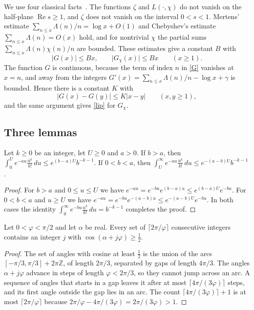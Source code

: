We use four classical facts~\cite{davenport}. The functions $\zeta$ and $L(\cdot,\chi)$ do not vanish on the half-plane $\operatorname{Re}s\ge1$, and $\zeta$ does not vanish on the interval $0<s<1$. Mertens' estimate $\sum_{n\le x}\Lambda(n)/n=\log x+O(1)$ and Chebyshev's estimate $\sum_{n\le x}\Lambda(n)=O(x)$ hold, and for nontrivial $\chi$ the partial sums $\sum_{n\le x}\Lambda(n)\chi(n)/n$ are bounded. These estimates give a constant $B$ with
\begin{equation}\label{triv}
\lvert G(x)\rvert\le Bx,\qquad \lvert G_\chi(x)\rvert\le Bx\qquad(x\ge1).
\end{equation}
The function $G$ is continuous, because the term of index $n$ in \eqref{G} vanishes at $x=n$, and away from the integers $G'(x)=\sum_{n\le x}\Lambda(n)/n-\log x+\gamma$ is bounded. Hence there is a constant $K$ with
\begin{equation}\label{lip}
\lvert G(x)-G(y)\rvert\le K\lvert x-y\rvert\qquad(x,y\ge1),
\end{equation}
and the same argument gives \eqref{lip} for $G_\chi$.

\subsection{Three lemmas}

\begin{lemma}\label{tails}
Let $k\ge0$ be an integer, let $U\ge0$ and $a>0$. If $b>a$, then $\int_0^Ue^{-au}\frac{u^k}{k!}\,du\le e^{(b-a)U}b^{-k-1}$. If $0<b<a$, then $\int_U^\infty e^{-au}\frac{u^k}{k!}\,du\le e^{-(a-b)U}b^{-k-1}$.
\end{lemma}

\begin{proof}
For $b>a$ and $0\le u\le U$ we have $e^{-au}=e^{-bu}e^{(b-a)u}\le e^{(b-a)U}e^{-bu}$. For $0<b<a$ and $u\ge U$ we have $e^{-au}=e^{-bu}e^{-(a-b)u}\le e^{-(a-b)U}e^{-bu}$. In both cases the identity $\int_0^\infty e^{-bu}\frac{u^k}{k!}\,du=b^{-k-1}$ completes the proof.
\end{proof}

\begin{lemma}\label{rot}
Let $0<\varphi<\pi/2$ and let $\alpha$ be real. Every set of $\lceil2\pi/\varphi\rceil$ consecutive integers contains an integer $j$ with $\cos(\alpha+j\varphi)\ge\frac12$.
\end{lemma}

\begin{proof}
The set of angles with cosine at least $\frac12$ is the union of the arcs $[-\pi/3,\pi/3]+2\pi\mathbb Z$, of length $2\pi/3$, separated by gaps of length $4\pi/3$. The angles $\alpha+j\varphi$ advance in steps of length $\varphi<2\pi/3$, so they cannot jump across an arc. A sequence of angles that starts in a gap leaves it after at most $\lceil4\pi/(3\varphi)\rceil$ steps, and its first angle outside the gap lies in an arc. The count $\lceil4\pi/(3\varphi)\rceil+1$ is at most $\lceil2\pi/\varphi\rceil$ because $2\pi/\varphi-4\pi/(3\varphi)=2\pi/(3\varphi)>1$.
\end{proof}


